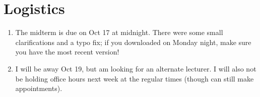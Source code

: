 \section{Logistics}

\begin{enumerate}
\item The midterm is due on Oct 17 at midnight.  There were some
  small clarifications and a typo fix; if you downloaded on Monday
  night, make sure you have the most recent version!
\item I will be away Oct 19, but am looking for an alternate lecturer.
  I will also not be holding office hours next week at the regular
  times (though can still make appointments).
\end{enumerate}
